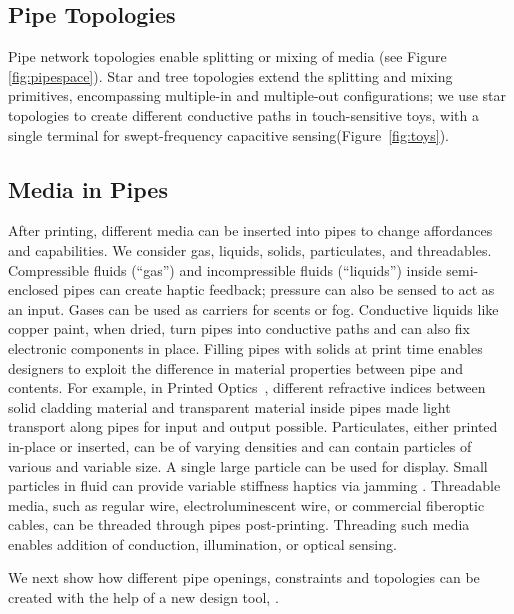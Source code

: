 \subsection{Pipe Topologies}
Pipe network topologies enable splitting or mixing of media (see Figure \ref{fig:pipespace}).  Star and tree topologies extend the splitting and mixing primitives, encompassing multiple-in and multiple-out configurations; we use star topologies to create different conductive paths in touch-sensitive toys, with a single terminal for swept-frequency capacitive sensing(Figure~\ref{fig:toys}).

\subsection{Media in Pipes}
After printing, different media can be inserted into pipes to change affordances and capabilities. We consider gas, liquids, solids, particulates, and threadables. 
%
Compressible fluids (``gas'') and incompressible fluids (``liquids'')  inside semi-enclosed pipes can create haptic feedback; pressure can also be sensed to act as an input. Gases can be used as carriers for scents or fog. Conductive liquids like copper paint, when dried, turn pipes into conductive paths and can also fix electronic components in place.
%
Filling pipes with solids at print time enables designers to exploit the difference in material properties between pipe and contents. For example, in Printed Optics~\cite{Willis-printedoptics}, different refractive indices between solid cladding material and transparent material inside pipes made light transport along pipes for input and output possible.
%
Particulates, either printed in-place or inserted, can be of varying densities and can contain particles of various and variable size.  A single large particle can be used for display.  Small particles in fluid can provide variable stiffness haptics via jamming \cite{Follmer-jamming}.
%
Threadable media, such as regular wire, electroluminescent wire, or commercial fiberoptic cables, can be threaded through pipes post-printing. Threading such media enables addition of conduction, illumination, or optical sensing. 

We next show how different pipe openings, constraints and topologies can be created with the help of a new design tool, \systemname.
